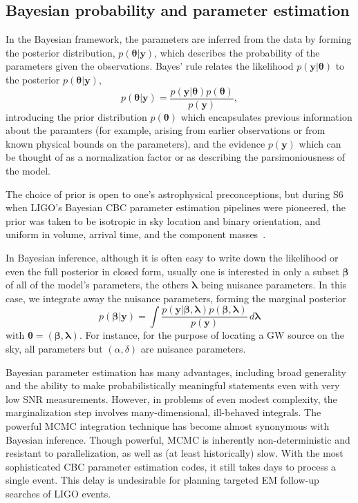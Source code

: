 \documentclass[amsmath,amssymb,aps,prx,reprint,nopreprintnumbers,nofootinbib]{revtex4-1}
\begin{document}
\subsection{Bayesian probability and parameter estimation}

In the Bayesian framework, the parameters are inferred from the data by forming the posterior distribution, $p(\bm\theta|\mathbf y)$, which describes the probability of the parameters given the observations. Bayes' rule relates the likelihood $p(\mathbf y|\bm\theta)$ to the posterior $p(\bm\theta|\mathbf y)$,
%
\begin{equation}\label{bayes}
p(\bm\theta|\mathbf y) = \frac{p(\mathbf y|\bm\theta) p(\bm\theta)}{p(\mathbf y)},
\end{equation}
%
introducing the prior distribution $p(\bm\theta)$ which encapsulates previous information about the paramters (for example, arising from earlier observations or from known physical bounds on the parameters), and the evidence $p(\mathbf y)$ which can be thought of as a normalization factor or as describing the parsimoniousness of the model.

The choice of prior is open to one's astrophysical preconceptions, but during \ac{S6} when LIGO's Bayesian \ac{CBC} parameter estimation pipelines were pioneered, the prior was taken to be isotropic in sky location and binary orientation, and uniform in volume, arrival time, and the component masses~\cite{2013arXiv1304.1775T}.

In Bayesian inference, although it is often easy to write down the likelihood or even the full posterior in closed form, usually one is interested in only a subset $\bm\beta$ of all of the model's parameters, the others $\bm\lambda$ being nuisance parameters. In this case, we integrate away the nuisance parameters, forming the marginal posterior
%
\begin{equation}\label{eq:marginal-posterior}
    p(\bm\beta|\mathbf y) = \int \frac{p(\mathbf y|\bm\beta,\bm\lambda) p(\bm\beta,\bm\lambda)}{p(\mathbf y)} \,d\bm\lambda
\end{equation}
%
with $\bm\theta = (\bm\beta, \bm\lambda)$. For instance, for the purpose of locating a \ac{GW} source on the sky, all parameters but $(\alpha, \delta)$ are nuisance parameters.

Bayesian parameter estimation has many advantages, including broad generality and the ability to make probabilistically meaningful statements even with very low \ac{SNR} measurements. However, in problems of even modest complexity, the marginalization step involves many-dimensional, ill-behaved integrals. The powerful \ac{MCMC} integration technique has become almost synonymous with Bayesian inference. Though powerful, \ac{MCMC} is inherently non-deterministic and resistant to parallelization, as well as (at least historically) slow. With the most sophisticated \ac{CBC} parameter estimation codes, it still takes days to process a single event. This delay is undesirable for planning targeted \ac{EM} follow\nobreakdashes-up searches of LIGO events.
\end{document}
